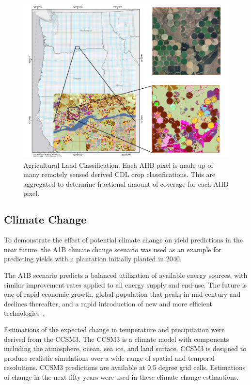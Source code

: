 \documentclass[preprint,12pt]{elsarticle}
\begin{document}
\begin{figure}[hp]
  \centering
  \includegraphics[width=1\linewidth]{land.png}
  \caption{Agricultural Land Classification.  Each \ac{AHB} pixel is made up of
    many remotely sensed derived \ac{CDL} crop classifications.  This
    are aggregated to determine fractional amount of coverage for each
    \ac{AHB} pixel. }
  \label{fig:land}
\end{figure}

\subsection{Climate Change}

To demonstrate the effect of potential climate change on yield
predictions in the near future, the A1B climate change scenario was
used as an example for predicting yields with a plantation initially
planted in 2040.

The A1B scenario predicts a balanced utilization of available energy
sources, with similar improvement rates applied to all energy supply
and end-use.  The future is one of rapid economic growth, global
population that peaks in mid-century and declines thereafter, and a
rapid introduction of new and more efficient
technologies~\cite{IPCC2007,Parry2007}.

Estimations of the expected change in temperature and precipitation
were derived from the \ac{CCSM3}.  The \ac{CCSM3} is a climate model
with components including the atmosphere, ocean, sea ice, and land
surface. \ac{CCSM3} is designed to produce realistic simulations over
a wide range of spatial and temporal resolutions.  \ac{CCSM3}
predictions are available at 0.5 degree grid cells.  Estimations of
change in the next fifty years were used in these climate change
estimations.
\end{document}
